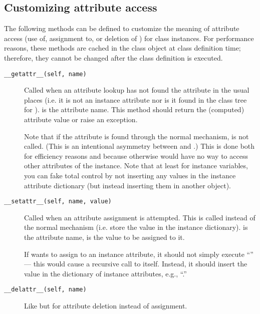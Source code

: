 \subsection{Customizing attribute access}

The following methods can be defined to customize the meaning of
attribute access (use of, assignment to, or deletion of )
for class instances.
For performance reasons, these methods are cached in the class object
at class definition time; therefore, they cannot be changed after the
class definition is executed.

\begin{description}

\item[{\tt __getattr__(self, name)}]
Called when an attribute lookup has not found the attribute in the
usual places (i.e. it is not an instance attribute nor is it found in
the class tree for ).   is the attribute name.
This method should return the (computed) attribute value or raise an
 exception.

Note that if the attribute is found through the normal mechanism,
 is not called.  (This is an intentional asymmetry between
 and .)
This is done both for efficiency reasons and because otherwise
 would have no way to access other attributes of the
instance.
Note that at least for instance variables, you can fake
total control by not inserting any values in the instance
attribute dictionary (but instead inserting them in another object).

\item[{\tt __setattr__(self, name, value)}]
Called when an attribute assignment is attempted.  This is called
instead of the normal mechanism (i.e. store the value in the instance
dictionary).   is the attribute name,  is the
value to be assigned to it.

If  wants to assign to an instance attribute, it
should not simply execute ``'' --- this would
cause a recursive call to itself.  Instead, it should insert the value in the
dictionary of instance attributes, e.g.,
``.''

\item[{\tt __delattr__(self, name)}]
Like  but for attribute deletion instead of
assignment.

\end{description}


